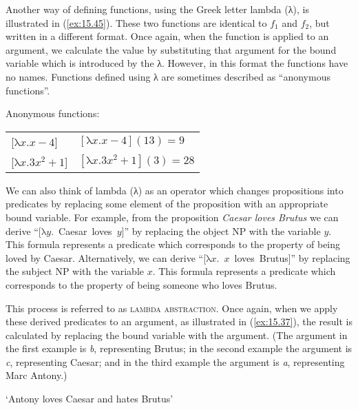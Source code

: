 Another way of defining functions, using the {Greek} letter lambda (λ), is illustrated in (\ref{ex:15.45}). These two functions are identical to $f_1$ and $f_2$, but written in a different format. Once again, when the function is applied to an argument, we calculate the value by substituting that argument for the bound variable which is introduced by the λ. However, in this format the functions have no names. Functions defined using λ are sometimes described as “anonymous functions”.

\ea \label{ex:15.45}
Anonymous functions:\\
\begin{tabular}{ll}
{}[$\text{λ}x. x - 4$] & $[\text{λ}x. x - 4](13) = 9$\\
{}[$\text{λ}x. 3x^2 + 1$] & $[\text{λ}x. 3x^{2} + 1](3) = 28$
\end{tabular}
\z 

We can also think of lambda (λ) as an operator which changes propositions into predicates by replacing some element of the proposition with an appropriate bound variable. For example, from the proposition \textit{Caesar loves Brutus} we can derive “[$\text{λ}y$.~Caesar~loves~$y$]” by replacing the object NP with the variable $y$. This formula represents a predicate which corresponds to the property of being loved by Caesar. Alternatively, we can derive “[$\text{λ}x$.~$x$~loves~Brutus]” by replacing the subject NP with the variable $x$. This formula represents a predicate which corresponds to the property of being someone who loves Brutus.



This process is referred to as \textsc{lambda abstraction}. Once again, when we apply these derived predicates to an argument, as illustrated in (\ref{ex:15.37}), the result is calculated by replacing the bound variable with the argument. (The argument in the first example is \textit{b}, representing Brutus; in the second example the argument is \textit{c}, representing Caesar; and in the third example the argument is \textit{a}, representing Marc Antony.)


\ea \label{ex:15.37}
\hfill ‘Antony loves Caesar and hates Brutus’
\z


